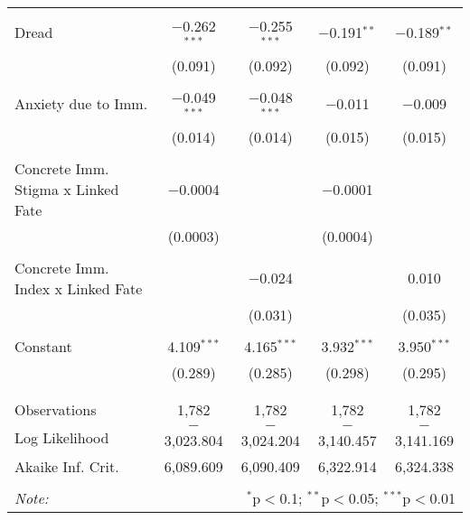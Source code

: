 \begin{table}[!htbp]
\begin{tabular}{@{\extracolsep{5pt}}lcccc}
  & & & & \\ 
 Dread & $-$0.262$^{***}$ & $-$0.255$^{***}$ & $-$0.191$^{**}$ & $-$0.189$^{**}$ \\ 
  & (0.091) & (0.092) & (0.092) & (0.091) \\ 
  & & & & \\ 
 Anxiety due to Imm. & $-$0.049$^{***}$ & $-$0.048$^{***}$ & $-$0.011 & $-$0.009 \\ 
  & (0.014) & (0.014) & (0.015) & (0.015) \\ 
  & & & & \\ 
 Concrete Imm. Stigma x Linked Fate & $-$0.0004 &  & $-$0.0001 &  \\ 
  & (0.0003) &  & (0.0004) &  \\ 
  & & & & \\ 
 Concrete Imm. Index x Linked Fate &  & $-$0.024 &  & 0.010 \\ 
  &  & (0.031) &  & (0.035) \\ 
  & & & & \\ 
 Constant & 4.109$^{***}$ & 4.165$^{***}$ & 3.932$^{***}$ & 3.950$^{***}$ \\ 
  & (0.289) & (0.285) & (0.298) & (0.295) \\ 
  & & & & \\ 
\hline \\[-1.8ex] 
Observations & 1,782 & 1,782 & 1,782 & 1,782 \\ 
Log Likelihood & $-$3,023.804 & $-$3,024.204 & $-$3,140.457 & $-$3,141.169 \\ 
Akaike Inf. Crit. & 6,089.609 & 6,090.409 & 6,322.914 & 6,324.338 \\ 
\hline 
\hline \\[-1.8ex] 
\textit{Note:}  & \multicolumn{4}{r}{$^{*}$p$<$0.1; $^{**}$p$<$0.05; $^{***}$p$<$0.01} \\ 
\end{tabular} 
\end{table} 
